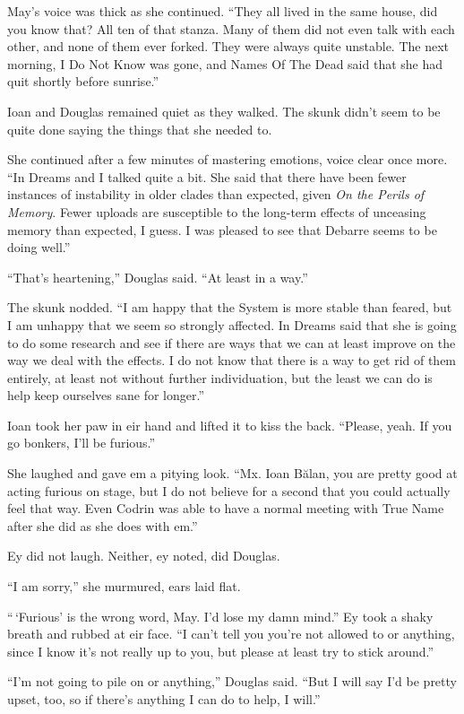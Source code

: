May's voice was thick as she continued. ``They all lived in the same house, did you know that? All ten of that stanza. Many of them did not even talk with each other, and none of them ever forked. They were always quite unstable. The next morning, I Do Not Know was gone, and Names Of The Dead said that she had quit shortly before sunrise.''

Ioan and Douglas remained quiet as they walked. The skunk didn't seem to be quite done saying the things that she needed to.

She continued after a few minutes of mastering emotions, voice clear once more. ``In Dreams and I talked quite a bit. She said that there have been fewer instances of instability in older clades than expected, given \emph{On the Perils of Memory}. Fewer uploads are susceptible to the long-term effects of unceasing memory than expected, I guess. I was pleased to see that Debarre seems to be doing well.''

``That's heartening,'' Douglas said. ``At least in a way.''

The skunk nodded. ``I am happy that the System is more stable than feared, but I am unhappy that we seem so strongly affected. In Dreams said that she is going to do some research and see if there are ways that we can at least improve on the way we deal with the effects. I do not know that there is a way to get rid of them entirely, at least not without further individuation, but the least we can do is help keep ourselves sane for longer.''

Ioan took her paw in eir hand and lifted it to kiss the back. ``Please, yeah. If you go bonkers, I'll be furious.''

She laughed and gave em a pitying look. ``Mx. Ioan Bălan, you are pretty good at acting furious on stage, but I do not believe for a second that you could actually feel that way. Even Codrin was able to have a normal meeting with True Name after she did as she does with em.''

Ey did not laugh. Neither, ey noted, did Douglas.

``I am sorry,'' she murmured, ears laid flat.

``\,`Furious' is the wrong word, May. I'd lose my damn mind.'' Ey took a shaky breath and rubbed at eir face. ``I can't tell you you're not allowed to or anything, since I know it's not really up to you, but please at least try to stick around.''

``I'm not going to pile on or anything,'' Douglas said. ``But I will say I'd be pretty upset, too, so if there's anything I can do to help, I will.''

